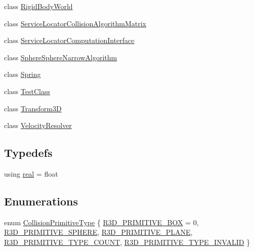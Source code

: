 \begin{DoxyCompactItemize}
class \mbox{\hyperlink{classr3_1_1_rigid_body_world}{Rigid\+Body\+World}}
\item 
class \mbox{\hyperlink{classr3_1_1_service_locator_collision_algorithm_matrix}{Service\+Locator\+Collision\+Algorithm\+Matrix}}
\item 
class \mbox{\hyperlink{classr3_1_1_service_locator_computation_interface}{Service\+Locator\+Computation\+Interface}}
\item 
class \mbox{\hyperlink{classr3_1_1_sphere_sphere_narrow_algorithm}{Sphere\+Sphere\+Narrow\+Algorithm}}
\item 
class \mbox{\hyperlink{classr3_1_1_spring}{Spring}}
\item 
class \mbox{\hyperlink{classr3_1_1_test_class}{Test\+Class}}
\item 
class \mbox{\hyperlink{classr3_1_1_transform3_d}{Transform3D}}
\item 
class \mbox{\hyperlink{classr3_1_1_velocity_resolver}{Velocity\+Resolver}}
\end{DoxyCompactItemize}
\subsection*{Typedefs}
\begin{DoxyCompactItemize}
\item 
using \mbox{\hyperlink{namespacer3_ab2016b3e3f743fb735afce242f0dc1eb}{real}} = float
\end{DoxyCompactItemize}
\subsection*{Enumerations}
\begin{DoxyCompactItemize}
\item 
enum \mbox{\hyperlink{namespacer3_a7079ec5e42c1a55140d3bc093d49e319}{Collision\+Primitive\+Type}} \{ \newline
\mbox{\hyperlink{namespacer3_a7079ec5e42c1a55140d3bc093d49e319ab0db447fd7b2de84191d8b29231a2103}{R3\+D\+\_\+\+P\+R\+I\+M\+I\+T\+I\+V\+E\+\_\+\+B\+OX}} = 0, 
\mbox{\hyperlink{namespacer3_a7079ec5e42c1a55140d3bc093d49e319a287c9eb57336315360581fa6312676b5}{R3\+D\+\_\+\+P\+R\+I\+M\+I\+T\+I\+V\+E\+\_\+\+S\+P\+H\+E\+RE}}, 
\mbox{\hyperlink{namespacer3_a7079ec5e42c1a55140d3bc093d49e319a985a46f234b04b101f07474c97709be7}{R3\+D\+\_\+\+P\+R\+I\+M\+I\+T\+I\+V\+E\+\_\+\+P\+L\+A\+NE}}, 
\mbox{\hyperlink{namespacer3_a7079ec5e42c1a55140d3bc093d49e319aab4ac7e02ac0e76beed256986ef52cea}{R3\+D\+\_\+\+P\+R\+I\+M\+I\+T\+I\+V\+E\+\_\+\+T\+Y\+P\+E\+\_\+\+C\+O\+U\+NT}}, 
\newline
\mbox{\hyperlink{namespacer3_a7079ec5e42c1a55140d3bc093d49e319af4fa492ea93899254dd76639bbc4f30a}{R3\+D\+\_\+\+P\+R\+I\+M\+I\+T\+I\+V\+E\+\_\+\+T\+Y\+P\+E\+\_\+\+I\+N\+V\+A\+L\+ID}}
 \}
\end{DoxyCompactItemize}


